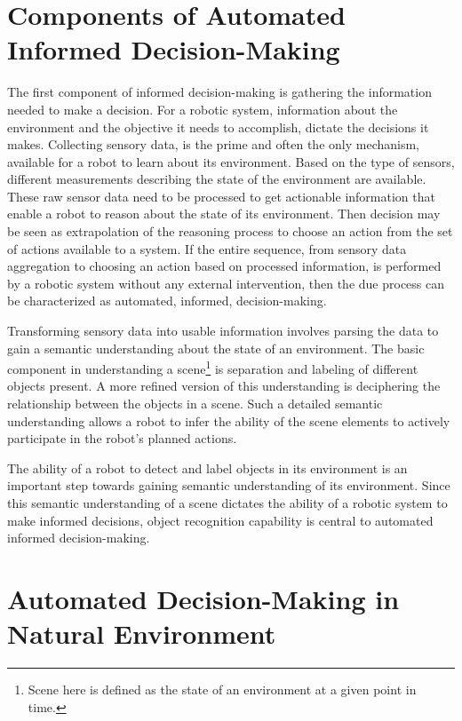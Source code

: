 \section{Components of Automated Informed Decision-Making}

The first component of informed decision-making is gathering the information needed to make a decision. 
For a robotic system,
information about the environment and the objective it needs to accomplish, dictate the decisions it makes. 
Collecting sensory data, is the prime 
and often the only mechanism, available for a robot to learn about its environment. Based on the 
type of sensors, different measurements describing the state of the environment are available. 
These raw sensor data need to be processed to get actionable information that enable a robot to reason about the state of its environment. 
Then decision may be seen as extrapolation of the reasoning process to choose an action from the set of actions available to a system.
If the entire sequence, from sensory data aggregation to choosing an action based on processed information, is performed by
a robotic system without any external intervention, then the due process can be characterized as automated, informed, decision-making. 

Transforming sensory data into usable information involves parsing the data to gain a semantic understanding about the state of an environment.
The basic component in understanding a scene\footnote{Scene here is defined as the state of an environment at a given point in time.} is separation and labeling of different objects present.
A more refined version of this understanding is deciphering the relationship between the objects in a scene.
Such a detailed semantic understanding allows a robot to infer the ability of the scene elements 
to actively participate in the robot's planned actions.

The ability of a robot to detect and label objects in its environment is an important step towards gaining semantic understanding of its environment.
Since this semantic understanding of a scene dictates the ability of a robotic system to make informed decisions, object recognition capability
is central to automated informed decision-making.

\section{Automated Decision-Making in Natural Environment}

